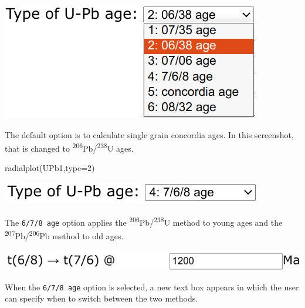 \begin{refsection}
\begin{enumerate}
\noindent\begin{minipage}[t]{.35\linewidth}
  \strut\vspace*{-\baselineskip}\newline
  \includegraphics[width=\linewidth]{../figures/UPbRadialAgeTypes.png}
\end{minipage}
\begin{minipage}[t]{.65\linewidth}
  The default option is to calculate single grain concordia ages. In
  this screenshot, that is changed to
  \textsuperscript{206}Pb/\textsuperscript{238}U ages.
\end{minipage}

\begin{console}
radialplot(UPb1,type=2)
\end{console}

\noindent\begin{minipage}[t]{.4\linewidth}
  \strut\vspace*{-\baselineskip}\newline
  \includegraphics[width=\linewidth]{../figures/UPbRadial678age.png}
\end{minipage}
\begin{minipage}[t]{.6\linewidth}
  The \texttt{6/7/8 age} option applies the
  \textsuperscript{206}Pb/\textsuperscript{238}U method to young ages
  and the \textsuperscript{207}Pb/\textsuperscript{206}Pb method to
  old ages.
\end{minipage}

\noindent\begin{minipage}[t]{.45\linewidth}
  \strut\vspace*{-\baselineskip}\newline
  \includegraphics[width=\linewidth]{../figures/UPbRadial678switch.png}
\end{minipage}
\begin{minipage}[t]{.55\linewidth}
  When the \texttt{6/7/8 age} option is selected, a new text box
  appears in which the user can specify when to switch between the two
  methods.
\end{minipage}


\end{enumerate}
\end{refsection}
